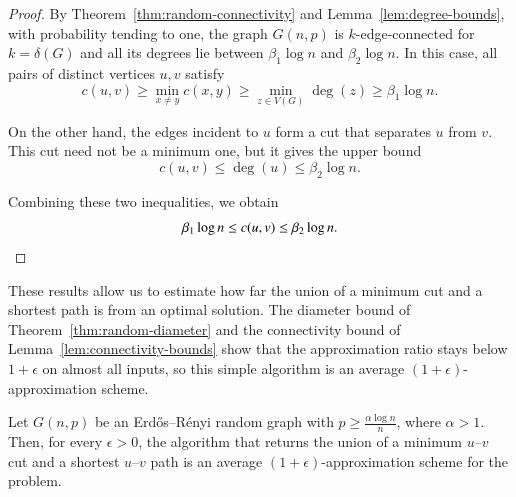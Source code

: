 \begin{proof}
By Theorem~\ref{thm:random-connectivity} and Lemma~\ref{lem:degree-bounds}, with probability tending to one, the graph $G(n, p)$ is $k$-edge-connected for $k = \delta(G)$ and all its degrees lie between $\beta_1 \log n$ and $\beta_2 \log n$.
In this case, all pairs of distinct vertices $u, v$ satisfy
\[
c(u, v) \geq \min_{x \neq y} c(x, y) \geq \min_{z \in V(G)} \deg(z) \geq \beta_1 \log n.
\]


On the other hand, the edges incident to $u$ form a cut that separates $u$ from $v$.
This cut need not be a minimum one, but it gives the upper bound
\[
c(u,v)\leq \deg(u) \leq \beta_2 \log n.
\]

Combining these two inequalities, we obtain
\[
\beta_1 \log n \leq c(u,v) \leq \beta_2 \log n. \qedhere
\]
\end{proof}



These results allow us to estimate how far the union of a minimum cut and a shortest path is from an optimal solution.
The diameter bound of Theorem~\ref{thm:random-diameter} and the connectivity bound of Lemma~\ref{lem:connectivity-bounds} show that the approximation ratio stays below $1+\epsilon$ on almost all inputs, so this simple algorithm is an average $(1+\epsilon)$-approximation scheme.

\begin{theorem}
\label{thm:approximation-scheme}
Let $G(n, p)$ be an Erdős–Rényi random graph with $p \geq \frac{\alpha \log n}{n}$, where $\alpha > 1$.
Then, for every $\epsilon > 0$, the algorithm that returns the union of a minimum $u$--$v$ cut and a shortest $u$--$v$ path is an average $(1+\epsilon)$-approximation scheme for the \MinCutPath{} problem.
\end{theorem}

